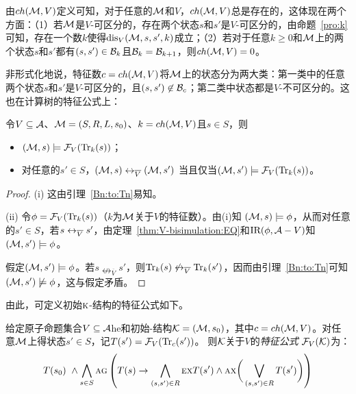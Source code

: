 由$ch({\cal M},V)$定义可知，对于任意的${\cal M}$和$V$，$ch({\cal M},V)$总是存在的，这体现在两个方面：（1）若${\cal M}$是$V$-可区分的，存在两个状态$s$和$s'$是$V$-可区分的，由命题~\ref{pro:k}可知，存在一个数$k$使得$\textrm{dis}_V({\cal M},s,s',k)$成立；（2）若对于任意$k\geq 0$和${\cal M}$上的两个状态$s$和$s'$都有$(s,s')\in {\cal B}_k$且${\cal B}_k ={\cal B}_{k+1}$，则$ch({\cal M},V)=0$。

非形式化地说，特征数$c=ch({\cal M},V)$将${\cal M}$上的状态分为两大类：第一类中的任意两个状态$s$和$s'$是$V$-可区分的，且$(s,s')\not \in {\cal B}_c$；第二类中状态都是$V$-不可区分的。这也在计算树的特征公式上：

\begin{lemma}\label{div_s}
	令$V\subseteq {\cal A}$、${\cal M}=(S,R,L,s_0)$、$k={ch({\cal M},V)}$且$s\in S$，则
	\begin{itemize}
		\item[(i)] $({\cal M}, s)\models {\cal F}_V(\textrm{Tr}_k(s))$；
		\item[(ii)] 对任意的$s'\in S$，$({\cal M},s) \leftrightarrow_{\overline V} ({\cal M},s')$
		当且仅当$({\cal M},s')\models{\cal F}_V(\textrm{Tr}_k(s))$。
	\end{itemize}
\end{lemma}
\begin{proof}
	(i) 这由引理~\ref{Bn:to:Tn}易知。
	
	(ii) 令$\phi = {\cal F}_V(\textrm{Tr}_k(s))$（$k$为${\cal M}$关于$V$的特征数）。由(i)知 $({\cal M}, s) \models \phi$，从而对任意的$s' \in S$，若$s \leftrightarrow_{\overline V} s'$，由定理~\ref{thm:V-bisimulation:EQ}和$\textrm{IR}(\phi, {\cal A} - V)$知$({\cal M}, s') \models \phi$。
	
	假定$({\cal M}, s')\models \phi$。若$s \nleftrightarrow_{\overline V} s'$，则$\textrm{Tr}_k(s) \not \leftrightarrow_{\overline V} \textrm{Tr}_k(s')$，因而由引理~\ref{Bn:to:Tn}可知$({\cal M}, s')\not \models \phi$，这与假定矛盾。
\end{proof}

由此，可定义初始$\textsc{k}$-结构的特征公式如下。

\begin{definition}[特征公式]
	给定原子命题集合$V\subseteq\cal A$he和初始\MPK-结构${\cal K}=({\cal M},s_0)$，其中$c=ch({\cal M},V)$。对任意${\cal M}$上得状态$s' \in S$，记$T(s') = {\cal F}_V(\textrm{Tr}_c(s'))$。
	则$\cal K$关于$V$的{\em 特征公式} ${\cal F}_V({\cal K})$为：
	\[T(s_0) \text{ } \wedge \bigwedge_{s\in S}\textsc{a} \textsc{g}\left(
	T(s) \rightarrow
	\bigwedge_{(s,s')\in R}
	\textsc{e} \textsc{x} T(s')
	\wedge
	\textsc{a} \textsc{x} \bigg(\bigvee_{(s,s')\in R}T(s')\bigg)
	\right)
	\]
	
\end{definition}

